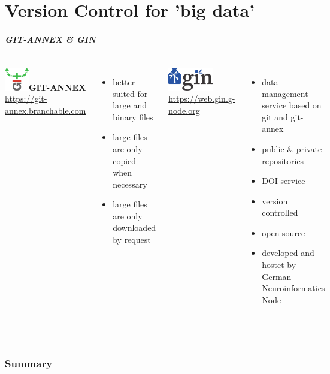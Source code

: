 \documentclass[
t, %
10pt, %
aspectratio=1610, %
ngerman,
english,
]{beamer}
\begin{document}
\part{Version Control for 'big data'}
\makepart

\begin{frame}
    \frametitle{GIT-ANNEX \& GIN}
    \begin{columns}
	\includegraphics[height=1cm]{graphics/gitannex_logo}\textbf{GIT-ANNEX}\\
	\url{https://git-annex.branchable.com}\\
	\begin{itemize}
	    \item better suited for large and binary files
	    \item large files are only copied when necessary
	    \item large files are only downloaded by request
	\end{itemize}
	\includegraphics[height=1cm]{graphics/GinLogo}\\
	\url{https://web.gin.g-node.org}\\
	\begin{itemize}
	    \item data management service based on git and git-annex
	    \item public \& private repositories
	    \item DOI service
	    \item version controlled
	    \item open source
	    \item developed and hostet by German Neuroinformatics Node
	\end{itemize}
    \end{columns}\\
\end{frame}


\section{Summary}
\end{document}
